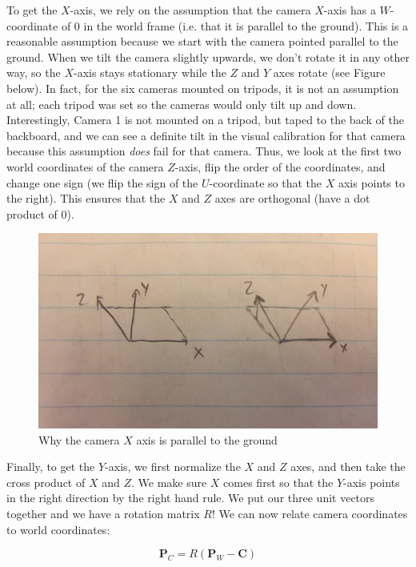 \documentclass{article}
\begin{document}
To get the $X$-axis, we rely on the assumption that the camera $X$-axis has a $W$-coordinate of 0 in the world frame (i.e. that it is parallel to the ground). 
This is a reasonable assumption because we start with the camera pointed parallel to the ground.  
When we tilt the camera slightly upwards, we don't rotate it in any other way, so the $X$-axis stays stationary while the $Z$ and $Y$ axes rotate (see Figure below). 
In fact, for the six cameras mounted on tripods, it is not an assumption at all; each tripod was set so the cameras would only tilt up and down.
Interestingly, Camera 1 is not mounted on a tripod, but taped to the back of the backboard, and we can see a definite tilt
in the visual calibration for that camera because this assumption \textit{does} fail for that camera.
Thus, we look at the first two world coordinates of the camera $Z$-axis, flip the order of the coordinates, 
and change one sign (we flip the sign of the $U$-coordinate so that the $X$ axis points to the right). 
This ensures that the $X$ and $Z$ axes are orthogonal (have a dot product of 0). \\

\begin{figure}[H]
\includegraphics[scale=0.6]{Rotation_Diagram}
\centering
\caption*{Why the camera $X$ axis is parallel to the ground}
\end{figure}

Finally, to get the $Y$-axis, we first normalize the $X$ and $Z$ axes, and then take the cross product of $X$ and $Z$. 
We make sure $X$ comes first so that the $Y$-axis points in the right direction by the right hand rule. 
We put our three unit vectors together and we have a rotation matrix $R$! 
We can now relate camera coordinates to world coordinates:

\[ \bm{P}_{C}=R(\bm{P}_{W}-\bm{C}) \]
\end{document}

